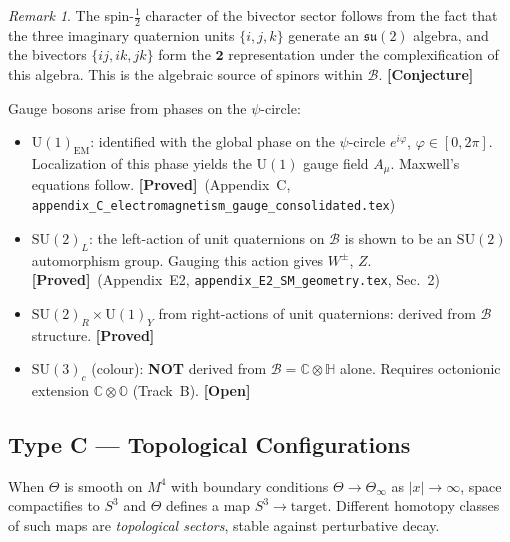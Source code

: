 \documentclass[12pt,a4paper]{article}
\theoremstyle{remark}
\newtheorem{remark}[theorem]{Remark}
\newcommand{\B}{\mathcal{B}}
\newcommand{\C}{\mathbb{C}}
\newcommand{\H}{\mathbb{H}}
\newcommand{\proved}{\textbf{[Proved]}}
\newcommand{\conjecture}{\textbf{[Conjecture]}}
\newcommand{\openq}{\textbf{[Open]}}
\begin{document}
\begin{remark}
The spin-$\tfrac{1}{2}$ character of the bivector sector follows from the
fact that the three imaginary quaternion units $\{i,j,k\}$ generate an
$\mathfrak{su}(2)$ algebra, and the bivectors $\{ij,ik,jk\}$ form the
$\mathbf{2}$ representation under the complexification of this algebra.
This is the algebraic source of spinors within $\B$. \conjecture
\end{remark}

Gauge bosons arise from phases on the $\psi$-circle:

\begin{itemize}
  \item $\mathrm{U}(1)_{\mathrm{EM}}$: identified with the global phase on the
        $\psi$-circle $e^{i\varphi}$, $\varphi\in[0,2\pi]$.  Localization
        of this phase yields the $\mathrm{U}(1)$ gauge field $A_\mu$.
        Maxwell's equations follow.  \proved\ (Appendix~C,
        \texttt{appendix\_C\_electromagnetism\_gauge\_consolidated.tex})
  \item $\mathrm{SU}(2)_L$: the left-action of unit quaternions on $\B$ is
        shown to be an $\mathrm{SU}(2)$ automorphism group.  Gauging this
        action gives $W^\pm$, $Z$.  \proved\ (Appendix~E2,
        \texttt{appendix\_E2\_SM\_geometry.tex}, Sec.~2)
  \item $\mathrm{SU}(2)_R\times\mathrm{U}(1)_Y$ from right-actions of
        unit quaternions: derived from $\B$ structure.  \proved\
  \item $\mathrm{SU}(3)_c$ (colour): \textbf{NOT} derived from $\B=\C\otimes\H$
        alone.  Requires octonionic extension $\C\otimes\mathbb{O}$ (Track~B).
        \openq
\end{itemize}

\subsection{Type C — Topological Configurations}
\label{sec:typeC}

When $\Theta$ is smooth on $M^4$ with boundary conditions
$\Theta\to\Theta_\infty$ as $|x|\to\infty$, space compactifies to $S^3$ and
$\Theta$ defines a map $S^3\to\text{target}$.  Different homotopy classes of
such maps are \emph{topological sectors}, stable against perturbative decay.
\end{document}
